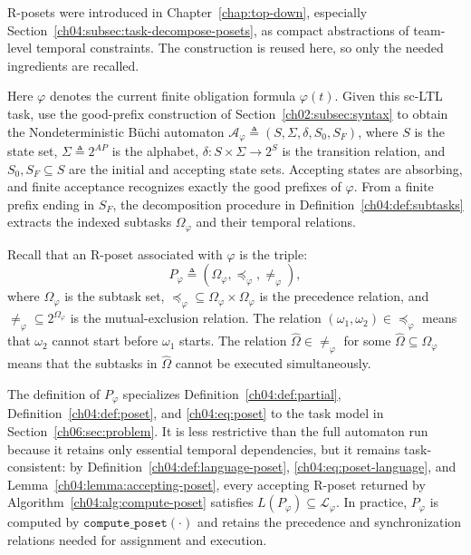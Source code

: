 R-posets were introduced in Chapter~\ref{chap:top-down}, especially
Section~\ref{ch04:subsec:task-decompose-posets}, as compact abstractions of
team-level temporal constraints. The construction is reused here, so only the
needed ingredients are recalled.
\begin{revision}
Here $\varphi$ denotes the current finite obligation formula $\varphi(t)$.
Given this sc-LTL task, use the good-prefix construction of
Section~\ref{ch02:subsec:syntax} to obtain the Nondeterministic B\"uchi automaton
$\mathcal{A}_{\varphi} \triangleq (S,\Sigma,\delta,S_0,S_F)$, where
$S$ is the state set, $\Sigma \triangleq 2^{AP}$ is the alphabet,
$\delta : S \times \Sigma \rightarrow 2^{S}$ is the transition
relation, and $S_0, S_F \subseteq S$ are the initial and accepting
state sets. Accepting states are absorbing, and finite acceptance recognizes
exactly the good prefixes of $\varphi$. From a finite prefix ending in $S_F$,
the decomposition procedure in Definition~\ref{ch04:def:subtasks} extracts
the indexed subtasks $\Omega_{\varphi}$ and their temporal relations.
\end{revision}
Recall that an R-poset associated with $\varphi$ is the triple:
\begin{equation}
\label{ch06:eq:r-poset}
P_{\varphi} \triangleq
(\Omega_{\varphi},\preceq_{\varphi},\neq_{\varphi}),
\end{equation}
where $\Omega_{\varphi}$ is the subtask set,
$\preceq_{\varphi} \subseteq
\Omega_{\varphi} \times \Omega_{\varphi}$ is the precedence relation,
and $\neq_{\varphi} \subseteq 2^{\Omega_{\varphi}}$ is the
mutual-exclusion relation. The relation
$(\omega_1,\omega_2) \in \preceq_{\varphi}$ means that
$\omega_2$ cannot start before $\omega_1$ starts. The relation
$\widehat{\Omega} \in \neq_{\varphi}$ for some
$\widehat{\Omega} \subseteq \Omega_{\varphi}$ means that the subtasks in
$\widehat{\Omega}$ cannot be executed simultaneously.


The definition of $P_{\varphi}$ specializes
Definition~\ref{ch04:def:partial}, Definition~\ref{ch04:def:poset}, and
\eqref{ch04:eq:poset} to the task model in
Section~\ref{ch06:sec:problem}. It is less restrictive than the full automaton
run because it retains only essential temporal dependencies, but it remains
task-consistent: by Definition~\ref{ch04:def:language-poset},
\eqref{ch04:eq:poset-language}, and
Lemma~\ref{ch04:lemma:accepting-poset}, every accepting R-poset returned by
Algorithm~\ref{ch04:alg:compute-poset} satisfies
$L(P_{\varphi}) \subseteq \mathcal{L}_{\varphi}$. In practice,
$P_{\varphi}$ is computed by
$\texttt{compute\_poset}(\cdot)$ and retains the precedence and
synchronization relations needed for assignment and execution.


